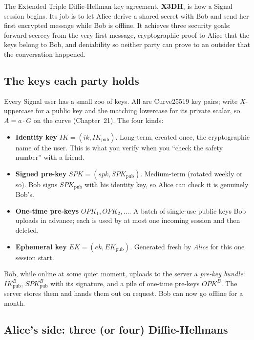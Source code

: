 The Extended Triple Diffie-Hellman key agreement, \textbf{X3DH}, is how a Signal session begins. Its job is to let Alice derive a shared secret with Bob and send her first encrypted message while Bob is offline. It achieves three security goals: forward secrecy from the very first message, cryptographic proof to Alice that the keys belong to Bob, and deniability so neither party can prove to an outsider that the conversation happened.

\subsection{The keys each party holds}
\label{ch27:x3dh-keys}

Every Signal user has a small zoo of keys. All are Curve25519 key pairs; write $X$-uppercase for a public key and the matching lowercase for its private scalar, so $A = a\cdot G$ on the curve (Chapter~21). The four kinds:

\begin{itemize}
  \item \textbf{Identity key} $IK = (ik, IK_{\mathrm{pub}})$. Long-term, created once, the cryptographic name of the user. This is what you verify when you ``check the safety number'' with a friend.
  \item \textbf{Signed pre-key} $SPK = (spk, SPK_{\mathrm{pub}})$. Medium-term (rotated weekly or so). Bob signs $SPK_{\mathrm{pub}}$ with his identity key, so Alice can check it is genuinely Bob's.
  \item \textbf{One-time pre-keys} $OPK_1, OPK_2, \dots$. A batch of single-use public keys Bob uploads in advance; each is used by at most one incoming session and then deleted.
  \item \textbf{Ephemeral key} $EK = (ek, EK_{\mathrm{pub}})$. Generated fresh by \emph{Alice} for this one session start.
\end{itemize}

Bob, while online at some quiet moment, uploads to the server a \emph{pre-key bundle}: $IK_{\mathrm{pub}}^B$, $SPK_{\mathrm{pub}}^B$ with its signature, and a pile of one-time pre-keys $OPK^B$. The server stores them and hands them out on request. Bob can now go offline for a month.

\subsection{Alice's side: three (or four) Diffie-Hellmans}
\label{ch27:x3dh-alice}


